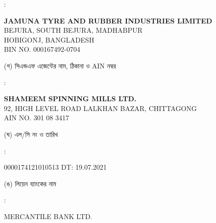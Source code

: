 \documentclass[12pt]{article}
\newcommand{\lcno}{0000174121010513}
\newcommand{\lcdt}{19.07.2021}
\newcommand{\lienbank}{MERCANTILE BANK LTD.}
\newcommand{\jtril}{JAMUNA TYRE AND RUBBER INDUSTRIES LIMITED}
\newcommand{\jtrila}{BEJURA, SOUTH BEJURA, MADHABPUR
\\
HOBIGONJ, BANGLADESH
}
\newcommand{\impn}{\jtril}
\newcommand{\impadd}{\jtrila}
\newcommand{\impbin}{000167492-0704}
\newcommand{\cnfn}{SHAMEEM SPINNING MILLS LTD.}
\newcommand{\cnfadd}{92, HIGH LEVEL ROAD
\newline
LALKHAN BAZAR, CHITTAGONG}
\newcommand{\cnfain}{301 08 3417}
\begin{document}
\begin{minipage}[t]{0.02\linewidth}
:
\end{minipage}
\begin{minipage}[t]{0.53\linewidth}
\textbf{{\impn}}
\\
{\impadd}
\\
BIN NO. {\impbin}
\\
\end{minipage}
\begin{minipage}[t]{0.05\linewidth}
\hspace*{1em}
\end{minipage}
\begin{minipage}[t]{0.40\linewidth}
(গ) সিএন্ডএফ এজেন্টের নাম, ঠিকানা
ও AIN নম্বর
\end{minipage}
\begin{minipage}[t]{0.02\linewidth}
:
\end{minipage}
\begin{minipage}[t]{0.53\linewidth}
\textbf{{\cnfn}}
\\
{\cnfadd}
\\
AIN NO. {\cnfain}
\\
\end{minipage}
\begin{minipage}[t]{0.05\linewidth}
\hspace*{1em}
\end{minipage}
\begin{minipage}[t]{0.40\linewidth}
(ঘ) এল/সি নং ও তারিখ
\end{minipage}
\begin{minipage}[t]{0.02\linewidth}
:
\end{minipage}
\begin{minipage}[t]{0.53\linewidth}
{\lcno} \hspace{2em} DT: {\lcdt}
\\
\end{minipage}
\begin{minipage}[t]{0.05\linewidth}
\hspace*{1em}
\end{minipage}
\begin{minipage}[t]{0.40\linewidth}
(ঙ) লিয়েন ব্যাংকের নাম
\end{minipage}
\begin{minipage}[t]{0.02\linewidth}
:
\end{minipage}
\begin{minipage}[t]{0.53\linewidth}
{\lienbank}
\\
\end{minipage}
\end{document}
